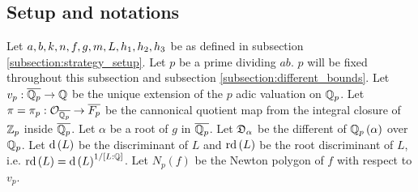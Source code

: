 \documentclass[../main.tex]{subfiles}
\begin{document}
\subsection{Setup and notations}
Let $a,b,k,n,f,g,m,L,h_{1},h_{2},h_{3}$ be as defined in subsection \ref{subsection:strategy_setup}.
Let $p$ be a prime dividing $ab$.
$p$ will be fixed throughout this subsection and subsection \ref{subsection:different_bounds}.
Let $v_p: \overline{\mathbb{Q}_p} \to \mathbb{Q}$ be the unique extension of the $p$ adic valuation on $\mathbb{Q}_p$.
Let $\pi = \pi_p: \mathcal{O}_{\overline{\mathbb{Q}_p}} \to \overline{F_p}$ be the cannonical quotient map from the integral closure of $\mathbb{Z}_p$ inside $\overline{\mathbb{Q}_p}$.
Let $\alpha$ be a root of $g$ in $\overline{\mathbb{Q}_p}$.
Let $\mathfrak{D}_\alpha$ be the different of $\mathbb{Q}_p\left( \alpha \right)$ over $\mathbb{Q}_p$.
Let $\operatorname{\rm d}\left( L \right)$ be the discriminant of $L$ and $\operatorname{\rm rd}\left( L \right)$ be the root discriminant of $L$, i.e. $\operatorname{\rm rd}\left( L \right) = \operatorname{\rm d}\left( L \right)^{1/\left[ L : \mathbb{Q} \right]}$.
Let $N_p\left( f \right)$ be the Newton polygon of $f$ with respect to $v_p$.
\end{document}
